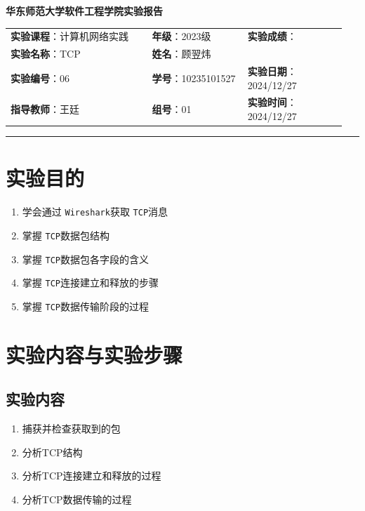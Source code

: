 \documentclass{article}
\begin{document}
	\begin{center}
		{\Large{\textbf{\heiti 华东师范大学软件工程学院实验报告}}}
		\begin{table}[htb]
			\flushleft
			\begin{tabular}{p{0.4\linewidth}p{0.27\linewidth}p{0.28\linewidth}}\\
				\textbf{实验课程}：计算机网络实践  & \textbf{年级}：2023级  & \textbf{实验成绩}：  \\
				\textbf{实验名称}：TCP  & \textbf{姓名}：顾翌炜  &                     \\
				\textbf{实验编号}：06  & \textbf{学号}：10235101527 & \textbf{实验日期}：2024/12/27  \\
				\textbf{指导教师}：王廷  & \textbf{组号}：01     & \textbf{实验时间}：2024/12/27  \\ 
			\end{tabular}
		\end{table}
	\end{center}
	\rule{\textwidth}{2pt}
	
	\section{实验目的}
	
	\begin{enumerate}[noitemsep, label={{\arabic*})}]
		\item 学会通过 \texttt{Wireshark}获取 \texttt{TCP}消息
		\item 掌握 \texttt{TCP}数据包结构
		\item 掌握 \texttt{TCP}数据包各字段的含义
		\item 掌握 \texttt{TCP}连接建立和释放的步骤
		\item 掌握 \texttt{TCP}数据传输阶段的过程
	\end{enumerate}
	
	\section{实验内容与实验步骤}
	
	\subsection{实验内容}
	
	\begin{enumerate}[noitemsep, label={{\arabic*})}]
		\item 捕获并检查获取到的包
		\item 分析TCP结构
		\item 分析TCP连接建立和释放的过程
		\item 分析TCP数据传输的过程
	\end{enumerate}\textbf{}
	
\end{document}
